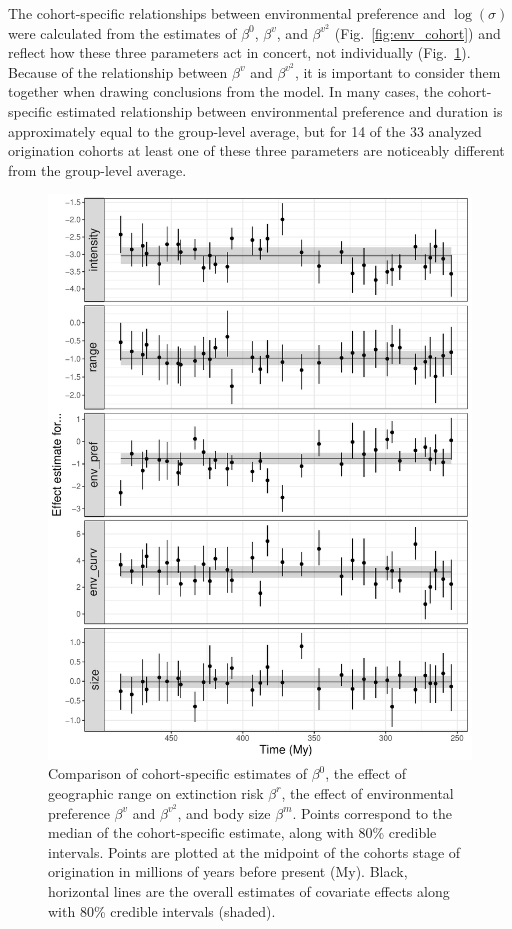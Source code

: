 \documentclass[11pt]{article}
\begin{document}
The cohort-specific relationships between environmental preference and \(\log(\sigma)\) were calculated from the estimates of \(\beta^{0}\), \(\beta^{v}\), and \(\beta^{v^{2}}\) (Fig.~\ref{fig:env_cohort}) and reflect how these three parameters act in concert, not individually (Fig.~\ref{fig:cohort_series}). Because of the relationship between \(\beta^{v}\) and \(\beta^{v^{2}}\), it is important to consider them together when drawing conclusions from the model. In many cases, the cohort-specific estimated relationship between environmental preference and duration is approximately equal to the group-level average, but for 14 of the 33 analyzed origination cohorts at least one of these three parameters are noticeably different from the group-level average. 

\begin{figure}[ht]
  \centering
  \includegraphics[width = \textwidth,height = 0.7\textheight,keepaspectratio=true]{figure/cohort_series_cweib_cens}
  \caption{Comparison of cohort-specific estimates of \(\beta^{0}\), the effect of geographic range on extinction risk \(\beta^{r}\), the effect of environmental preference \(\beta^{v}\) and \(\beta^{v^{2}}\), and body size \(\beta^{m}\). Points correspond to the median of the cohort-specific estimate, along with 80\% credible intervals. Points are plotted at the midpoint of the cohorts stage of origination in millions of years before present (My). Black, horizontal lines are the overall estimates of covariate effects along with 80\% credible intervals (shaded).}
  \label{fig:cohort_series}
\end{figure}
\end{document}
